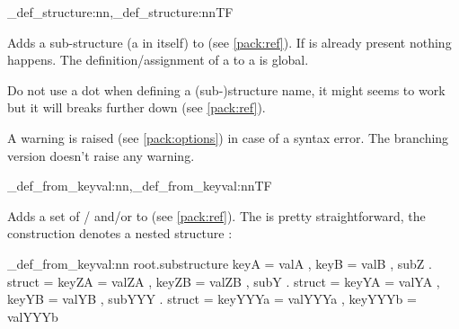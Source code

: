 \documentclass[10pt]{article}
\begin{document}
\begin{codedescribe}{\starray_def_structure:nn,\starray_def_structure:nnTF}
\begin{codesyntax}%
\end{codesyntax}
Adds a sub-structure (a  in itself) to  (see \ref{pack:ref}). If  is already present nothing happens. The definition/assignment of a  to a  is global.
\end{codedescribe}


\begin{tsremark}
Do not use a dot when defining a (sub-)structure name, it might seems to work but it will breaks further down (see \ref{pack:ref}).
\end{tsremark}


\begin{tsremark}[Note 2:]
A warning is raised (see \ref{pack:options}) in case of a  syntax error. The branching version doesn't raise any warning.
\end{tsremark}

\begin{codedescribe}{\starray_def_from_keyval:nn,\starray_def_from_keyval:nnTF}
\begin{codesyntax}%
\end{codesyntax}

Adds a set of  /  and/or  to  (see \ref{pack:ref}). The  is pretty straightforward, 
the construction  denotes a nested structure :
\end{codedescribe}

\begin{codestore}
\starray_def_from_keyval:nn {root.substructure} 
  {
    keyA = valA ,
    keyB = valB ,
    subZ . struct = 
      {
        keyZA = valZA ,
        keyZB = valZB ,
      }
    subY . struct =
      {
        keyYA = valYA ,
        keyYB = valYB ,
        subYYY . struct =
          {
            keyYYYa = valYYYa ,
            keyYYYb = valYYYb 
          }
      }
  }
\end{codestore}
\end{document}
